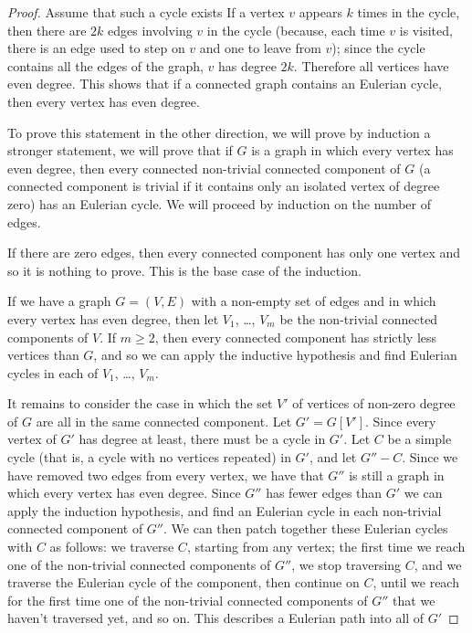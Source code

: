 \begin{proof}
  Assume that such a cycle exists
  If a vertex $v$ appears $k$ times in the cycle, then there are $2k$ edges
  involving $v$ in the cycle (because, each time $v$ is visited, there is an
  edge used to step on $v$ and one to leave from $v$); since the cycle contains
  all the edges of the graph, $v$ has degree $2k$. Therefore all vertices have
  even degree. This shows that if a connected graph contains an Eulerian cycle,
  then every vertex has even degree.

  To prove this statement in the other direction, we will prove by induction a
  stronger statement, we will prove that if $G$ is a graph in which every
  vertex has even degree, then every connected non-trivial connected
  component of $G$ (a connected component is trivial if it contains only an
  isolated vertex of degree zero) has an Eulerian cycle. We will proceed by
  induction on the number of edges.

  If there are zero edges, then every connected component has only one vertex
  and so it is nothing to prove. This is the base case of the induction.

  If we have a graph $G = (V,E)$ with a non-empty set of edges and in which
  every vertex has even degree, then let $V_1$, \dots, $V_m$ be the non-trivial
  connected components of $V$. If $m \ge 2$, then every connected component has
  strictly less vertices than $G$, and so we can apply the inductive hypothesis
  and find Eulerian cycles in each of $V_1$, \dots, $V_m$.

  It remains to consider the case in which the set $V'$ of vertices of non-zero
  degree of $G$ are all in the same connected component. Let $G' = G[V']$.
  Since every vertex of $G'$ has degree at least, there must be a cycle in
  $G'$. Let $C$ be a simple cycle (that is, a cycle with no vertices repeated)
  in $G'$, and let $G'' - C$. Since we have removed two edges from every
  vertex, we have that $G''$ is still a graph in which every vertex has even
  degree. Since $G''$ has fewer edges than $G'$ we can apply the induction
  hypothesis, and find an Eulerian cycle in each non-trivial connected
  component of $G''$. We can then patch together these Eulerian cycles with $C$
  as follows: we traverse $C$, starting from any vertex; the first time we
  reach one of the non-trivial connected components of $G''$, we stop
  traversing $C$, and we traverse the Eulerian cycle of the component, then
  continue on $C$, until we reach for the first time one of the non-trivial
  connected components of $G''$ that we haven’t traversed yet, and so on. This
  describes a Eulerian path into all of $G'$
\end{proof}

